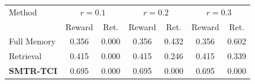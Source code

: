 \begin{tabular}{lcccccc}
\toprule
Method & \multicolumn{2}{c}{$r=0.1$} & \multicolumn{2}{c}{$r=0.2$} & \multicolumn{2}{c}{$r=0.3$} \\
 & Reward & Ret. & Reward & Ret. & Reward & Ret. \\
\midrule
Full Memory & 0.356 & 0.000 & 0.356 & 0.432 & 0.356 & 0.602 \\
Retrieval & 0.415 & 0.000 & 0.415 & 0.246 & 0.415 & 0.339 \\
\textbf{SMTR-TCI} & 0.695 & 0.000 & 0.695 & 0.000 & 0.695 & 0.000 \\
\bottomrule
\end{tabular}
